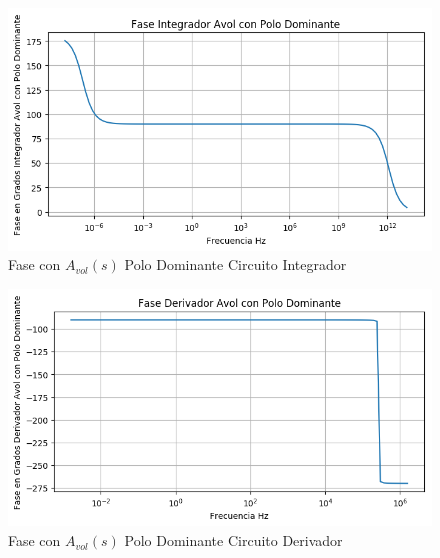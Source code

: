 \begin{figure}[H]
	\centering
	\includegraphics[width=\textwidth]{Ejercicio4/BODE-AVOLW-FASE-INTEGRADO}
	\caption{Fase con $A_{vol}(s)$ Polo Dominante Circuito Integrador}
\end{figure}


\begin{figure}[H]
	\centering
	\includegraphics[width=\textwidth]{Ejercicio4/BODE-AVOLW-FASE-DERIVADOR}
	\caption{Fase con $A_{vol}(s)$ Polo Dominante Circuito Derivador}
\end{figure}

